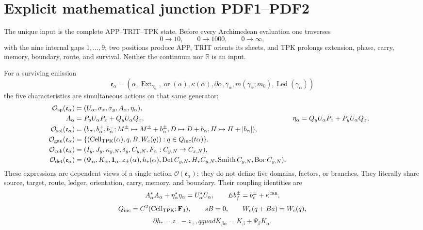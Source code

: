 
\section*{Explicit mathematical junction PDF1--PDF2}

The unique input is the complete APP--TRIT--TPK state. Before every
Archimedean evaluation one traverses
\[
 0\longrightarrow10,\qquad 0\longrightarrow1000,
 \qquad 0\longrightarrow\infty,
\]
with the nine internal gaps \(1,\ldots,9\); two positions produce APP,
TRIT orients its sheets, and TPK prolongs extension, phase, carry, memory,
boundary, route, and survival. Neither the continuum nor \(\mathbb R\) is an input.

For a surviving emission
\[
 \mathfrak e_\alpha=
 (\alpha,\operatorname{Ext}_{\gamma_\alpha},\operatorname{or}(\alpha),
 \kappa(\alpha),\partial\alpha,\gamma_\alpha,
 m(\gamma_\alpha;m_0),\operatorname{Led}(\gamma_\alpha))
\]
the five characteristics are simultaneous actions on that same
generator:
\begin{align*}
 \mathcal O_{\rm sp}(\mathfrak e_\alpha)
  &=(U_\alpha,\sigma_x,\sigma_y,A_\alpha,\eta_\alpha),\\
 A_\alpha&=P_yU_\alpha P_x+Q_yU_\alpha Q_x,
 &\eta_\alpha&=Q_yU_\alpha P_x+P_yU_\alpha Q_x,\\
 \mathcal O_{\rm sol}(\mathfrak e_\alpha)
  &=(b_\alpha,b_\alpha^+,b_\alpha^-;
  M^\pm\mapsto M^\pm+b_\alpha^\pm,
  D\mapsto D+b_\alpha,H\mapsto H+|b_\alpha|),\\
 \mathcal O_{\rm gau}(\mathfrak e_\alpha)
  &=\{(\operatorname{Cell}_{\rm TPK}(\alpha),q,B,W_c(q)):
      q\in Q_{\rm inc}(t\alpha)\},\\
 \mathcal O_{\rm coh}(\mathfrak e_\alpha)
  &=(I_y,J_y,\kappa_{y,N},\delta_y,C_{y,N},
      F_\alpha:C_{y,N}\to C_{x,N}),\\
 \mathcal O_{\rm det}(\mathfrak e_\alpha)
  &=(\Psi_\alpha,K_\alpha,\mathbf1_\alpha,z_\pm(\alpha),h_*(\alpha),
  \operatorname{Det}C_{y,N},H_*C_{y,N},\operatorname{Smith}C_{y,N},
  \operatorname{Boc}C_{y,N}).
\end{align*}
These expressions are dependent views of a single action
\(\mathcal O(\mathfrak e_\alpha)\); they do not define five domains, factors, or
branches. They literally share source, target, route, ledger, orientation,
carry, memory, and boundary. Their coupling identities are
\[
 A_\alpha^*A_\alpha+\eta_\alpha^*\eta_\alpha=U_\alpha^*U_\alpha,
 \qquad E b_f^\pm=b_c^\pm+\kappa^{\rm can},
\]
\[
 Q_{\rm inc}=C^2(\operatorname{Cell}_{\rm TPK};\mathbf F_3),
 \qquad sB=0,\qquad W_c(q+Ba)=W_c(q),
\]
\[
 \partial h_*=z_--z_+,qquad
 K_{\beta\alpha}=K_\beta+\Psi_\beta K_\alpha.
\]

